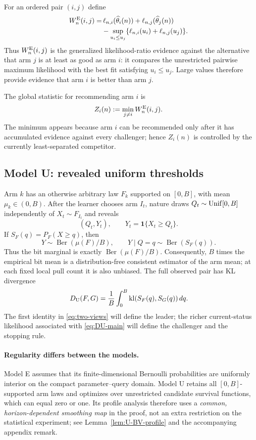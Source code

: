 \documentclass[twoside]{article}
\theoremstyle{definition}
\newcommand{\kl}{\operatorname{kl}}
\newcommand{\Ber}{\operatorname{Ber}}
\newcommand{\1}{\mathbf 1}
\begin{document}
For an ordered pair $(i,j)$ define
\begin{equation}
\begin{split}
W_n^{\rm E}(i,j)=&\,\ell_{n,i}(\widehat\theta_i(n))
+\ell_{n,j}(\widehat\theta_j(n))\\
&-\sup_{u_i\le u_j}\{\ell_{n,i}(u_i)+\ell_{n,j}(u_j)\}.
\end{split}
\label{eq:WE-main}
\end{equation}
Thus $W_n^{\rm E}(i,j)$ is the generalized likelihood-ratio evidence against
the alternative that arm $j$ is at least as good as arm $i$: it compares the
unrestricted pairwise maximum likelihood with the best fit satisfying
$u_i\le u_j$.  Large values therefore provide evidence that arm $i$ is better
than arm $j$.

The global statistic for recommending arm $i$ is
\[
Z_i(n):=\min_{j\neq i}W_n^{\rm E}(i,j).
\]
The minimum appears because arm $i$ can be recommended only after it has
accumulated evidence against every challenger; hence $Z_i(n)$ is controlled by
the currently least-separated competitor.

\subsection{Model U: revealed uniform thresholds}
Arm $k$ has an otherwise arbitrary law $F_k$ supported on $[0,B]$,
with mean $\mu_k\in(0,B)$.  After the learner chooses arm $I_t$, nature draws
$Q_t\sim{\rm Unif}[0,B]$ independently of $X_t\sim F_{I_t}$ and reveals
\[
(Q_t,Y_t),\qquad Y_t=\1\{X_t\ge Q_t\}.
\]
If $S_F(q)=P_F(X\ge q)$, then
\begin{equation}
Y\sim\Ber(\mu(F)/B),\qquad
Y\mid Q=q\sim\Ber(S_F(q)).
\label{eq:two-views}
\end{equation}
Thus the bit marginal is exactly $\Ber(\mu(F)/B)$.  Consequently,
$B$ times the empirical bit mean is a distribution-free consistent estimator
of the arm mean; at each fixed local pull count it is also unbiased.  The full
observed pair has KL divergence
\begin{equation}
D_{\rm U}(F,G)=\frac1B\int_0^B\kl(S_F(q),S_G(q))\,dq.
\label{eq:DU-main}
\end{equation}
The first identity in \eqref{eq:two-views} will define the leader; the richer current-status likelihood associated with \eqref{eq:DU-main} will define the challenger and the stopping rule.
\paragraph{Regularity differs between the models.}
Model E assumes that its finite-dimensional Bernoulli probabilities are
uniformly interior on the compact parameter--query domain.  Model U
retains all $[0,B]$-supported arm laws and optimizes over unrestricted candidate
survival functions, which can equal zero or one.  Its profile analysis
therefore uses a \emph{common, horizon-dependent smoothing map} in the
proof, not an extra restriction on the statistical experiment; see
Lemma~\ref{lem:U-BV-profile} and the accompanying appendix remark.
\end{document}
